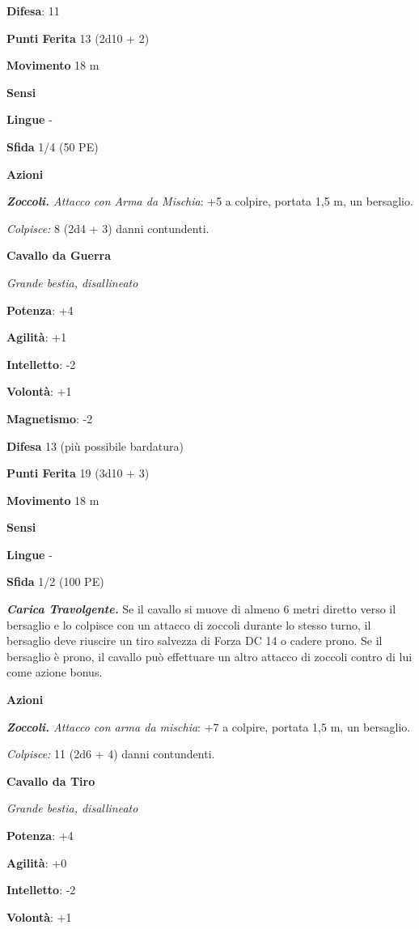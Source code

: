 \begin{multicols}{2}
\textbf{Difesa}: 11

\textbf{Punti Ferita} 13 (2d10 + 2)

\textbf{Movimento} 18 m

\textbf{Sensi} 

\textbf{Lingue} -

\textbf{Sfida} 1/4 (50 PE)

\textbf{Azioni}

\emph{\textbf{Zoccoli.} Attacco con Arma da Mischia}: +5 a colpire,
portata 1,5 m, un bersaglio.

\emph{Colpisce:} 8 (2d4 + 3) danni contundenti.



\textbf{Cavallo da Guerra}

\emph{Grande bestia, disallineato}

\textbf{Potenza}: +4

\textbf{Agilità}: +1

\textbf{Intelletto}: -2

\textbf{Volontà}: +1

\textbf{Magnetismo}: -2

\textbf{Difesa} 13 (più possibile bardatura)

\textbf{Punti Ferita} 19 (3d10 + 3)

\textbf{Movimento} 18 m

\textbf{Sensi} 

\textbf{Lingue} -

\textbf{Sfida} 1/2 (100 PE)

\emph{\textbf{Carica Travolgente.}} Se il cavallo si muove di almeno 6
metri diretto verso il bersaglio e lo colpisce con un attacco di zoccoli
durante lo stesso turno, il bersaglio deve riuscire un tiro salvezza di Forza DC 14 o cadere prono. Se il bersaglio è prono, il cavallo può
effettuare un altro attacco di zoccoli contro di lui come azione bonus.

\textbf{Azioni}

\emph{\textbf{Zoccoli.} Attacco con arma da mischia}: +7 a colpire,
portata 1,5 m, un bersaglio.

\emph{Colpisce:} 11 (2d6 + 4) danni contundenti.

\textbf{Cavallo da Tiro}

\emph{Grande bestia, disallineato}

\textbf{Potenza}: +4

\textbf{Agilità}: +0

\textbf{Intelletto}: -2

\textbf{Volontà}: +1


\end{multicols}
